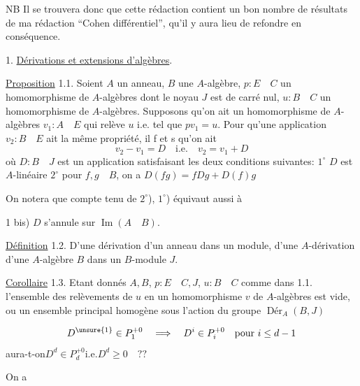 NB Il se trouvera donc que cette rédaction contient un bon nombre de résultats de ma rédaction ``Cohen différentiel'', qu'il y aura lieu de refondre en conséquence.

1. \uline{Dérivations et extensions d'algèbres}.

\uline{Proposition} 1.1. Soient $A$ un anneau, $B$ une $A$-algèbre, $p:E\quad C$ un homomorphisme de $A$-algèbres dont le noyau $J$ est de carré nul, $u:B\quad C$ un homomorphisme de $A$-algèbres. Supposons qu'on ait un homomorphisme de $A$-algèbres $v_1:A\quad E$ qui relève $u$ i.e. tel que $pv_1=u$. Pour qu'une application $v_2:B\quad E$ ait la même propriété, il f et s qu'on ait
\[v_2-v_1=D\quad\text{i.e.}\quad v_2=v_1+D\]
\margin{$\unsure{\supset}$}
où $D:B\quad J$ est un application satisfaisant les deux conditions suivantes: $1^\circ$ $D$ est $A$-linéaire $2^\circ$ pour $f,g\quad B$, on a $D(fg)=fDg+D(f)g$
\margin{$\unsure{\supset}$}

On notera que compte tenu de $2^\circ$), $1^\circ$) équivaut aussi à 

1 bis) $D$ s'annule sur $\operatorname{Im}(A\quad B)$.

\uline{Définition} 1.2. D'une dérivation d'un anneau dans un module, d'une $A$-dérivation d'une $A$-algèbre $B$ dans un $B$-module $J$.

\uline{Corollaire} 1.3. Etant donnés $A,B$,  $p:E\quad C,J$, $u:B\quad C$ comme dans 1.1.  l'ensemble des relèvements de $u$ en un homomorphisme $v$ de $A$-algèbres est vide, ou un ensemble principal homogène sous l'action du groupe $\operatorname{Dér}_A(B,J)$

\[D^{\unsure{1}}\in P_1^{+0}\quad\Longrightarrow\quad D^i\in P_i^{+0}\quad\text{pour }i\leq d-1\]
\quad aura-t-on\quad $D^d\in P_d^{+0}$\quad i.e.\quad $D^d\geq0\quad??$

On a


